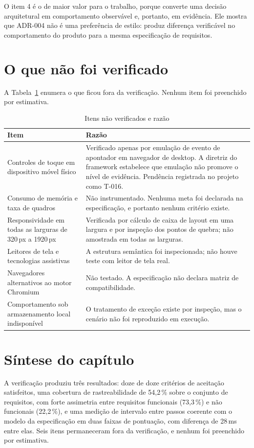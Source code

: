 O item 4 é o de maior valor para o trabalho, porque converte uma decisão
arquitetural em comportamento observável e, portanto, em evidência. Ele mostra
que ADR-004 não é uma preferência de estilo: produz diferença verificável no
comportamento do produto para a mesma especificação de requisitos.

\section{O que não foi verificado}
\label{sec:res-nao-verificado}

A Tabela~\ref{tab:nao-verificado} enumera o que ficou fora da verificação. Nenhum
item foi preenchido por estimativa.

\begin{table}[htb]
	\caption{Itens não verificados e razão}
	\label{tab:nao-verificado}
	\centering
	\footnotesize
	\begin{tabularx}{\textwidth}{@{}p{4.6cm} X@{}}
		\toprule
		\textbf{Item} & \textbf{Razão} \\
		\midrule
		Controles de toque em dispositivo móvel físico & Verificado apenas por emulação de evento de apontador em navegador de desktop. A diretriz do framework estabelece que emulação não promove o nível de evidência. Pendência registrada no projeto como T-016. \\
		\addlinespace
		Consumo de memória e taxa de quadros & Não instrumentado. Nenhuma meta foi declarada na especificação, e portanto nenhum critério existe. \\
		\addlinespace
		Responsividade em todas as larguras de 320\,px a 1920\,px & Verificada por cálculo de caixa de layout em uma largura e por inspeção dos pontos de quebra; não amostrada em todas as larguras. \\
		\addlinespace
		Leitores de tela e tecnologias assistivas & A estrutura semântica foi inspecionada; não houve teste com leitor de tela real. \\
		\addlinespace
		Navegadores alternativos ao motor Chromium & Não testado. A especificação não declara matriz de compatibilidade. \\
		\addlinespace
		Comportamento sob armazenamento local indisponível & O tratamento de exceção existe por inspeção, mas o cenário não foi reproduzido em execução. \\
		\bottomrule
	\end{tabularx}
\end{table}

\section{Síntese do capítulo}
\label{sec:res-sintese}

A verificação produziu três resultados: doze de doze critérios de aceitação
satisfeitos, uma cobertura de rastreabilidade de 54,2\,\% sobre o conjunto de
requisitos, com forte assimetria entre requisitos funcionais (73,3\,\%) e não
funcionais (22,2\,\%), e uma medição de intervalo entre passos coerente com o
modelo da especificação em duas faixas de pontuação, com diferença de 28\,ms entre
elas. Seis itens permaneceram fora da verificação, e nenhum foi preenchido por
estimativa.
